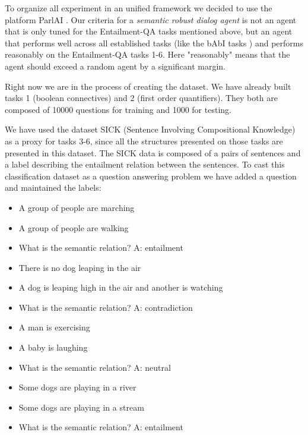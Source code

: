 To organize all experiment in an unified framework we decided to use the platform ParlAI \cite{MillerFFLBBPW17}. Our criteria for a \textit{semantic robust dialog agent} is not an agent that is only tuned for the Entailment-QA tasks mentioned above, but an agent that performs well across all established tasks (like the bAbI tasks \cite{WestonBCM15}) and performs reasonably on the Entailment-QA tasks 1-6. Here "reasonably" means that the agent should exceed a random agent by a significant margin.

Right now we are in the process of creating the dataset. We have already built tasks 1 (boolean connectives) and 2 (first order quantifiers). They both are composed of 10000 questions for training and 1000 for testing.

We have used the dataset SICK (Sentence Involving Compositional Knowledge) \cite{Marelli14} as a proxy for tasks 3-6, since all the structures presented on those tasks are presented in this dataset. The SICK data is composed of a pairs of sentences and a label describing the entailment relation between the sentences. To cast this classification dataset as a question answering problem we have added a question and maintained the labels: 

\begin{itemize} 
\item[] A group of people are marching
\item[] A group of people are walking
\item[] What is the semantic relation? A: entailment
\end{itemize}

\begin{itemize} 
\item[] There is no dog leaping in the air
\item[] A dog is leaping high in the air and another is watching
\item[] What is the semantic relation? A: contradiction
\end{itemize}

\begin{itemize} 
\item[] A man is exercising
\item[] A baby is laughing
\item[] What is the semantic relation? A: neutral
\end{itemize}

\begin{itemize} 
\item[] Some dogs are playing in a river
\item[] Some dogs are playing in a stream
\item[] What is the semantic relation? A: entailment
\end{itemize}

